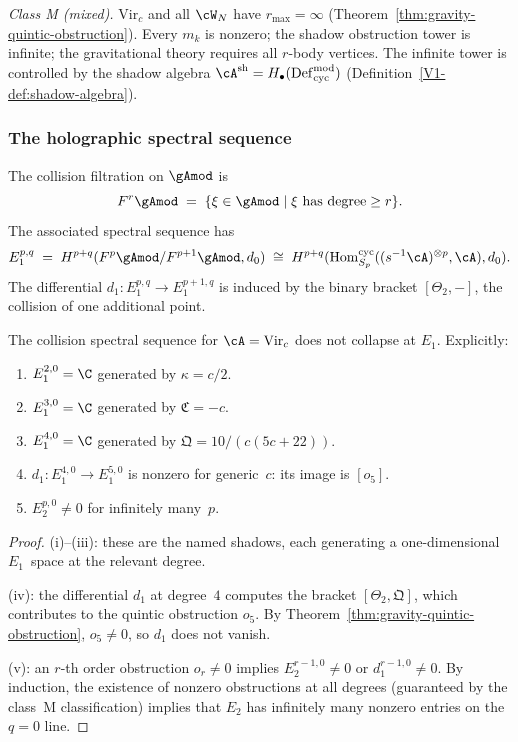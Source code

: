 \emph{Class M (mixed).}\enspace
$\mathrm{Vir}_c$ and all $\cW_N$ have $r_{\max} = \infty$
(Theorem~\ref{thm:gravity-quintic-obstruction}). Every $m_k$
is nonzero; the shadow obstruction tower is infinite; the gravitational
theory requires all $r$-body vertices. The infinite tower
is controlled by the shadow algebra $\cA^{\mathrm{sh}}
= H_\bullet(\mathrm{Def}_{\mathrm{cyc}}^{\mathrm{mod}})$
(Definition~\ref{V1-def:shadow-algebra}).

\subsubsection*{The holographic spectral sequence}

\begin{construction}
\label{constr:gravity-collision-ss}
The collision filtration on $\gAmod$ is
\[
F^r\gAmod
\;=\;
\{
 \xi \in \gAmod
 \mid
 \xi\text{ has degree} \ge r
\}.
\]
The associated spectral sequence has
\[
E_1^{p,q}
\;=\;
H^{p+q}(F^p\gAmod / F^{p+1}\gAmod, d_0)
\;\cong\;
H^{p+q}(\operatorname{Hom}_{S_p}^{\mathrm{cyc}}(
 (s^{-1}\cA)^{\otimes p}, \cA), d_0).
\]
The differential $d_1 \colon E_1^{p,q} \to E_1^{p+1,q}$ is
induced by the binary bracket $[\Theta_2, -]$, the collision of
one additional point.
\end{construction}

\begin{proposition}
\label{prop:gravity-ss-non-collapse}
The collision spectral sequence for $\cA = \mathrm{Vir}_c$ does
not collapse at $E_1$. Explicitly:
\begin{enumerate}[label=\textup{(\roman*)}]
\item $E_1^{2,0} = \C$ generated by $\kappa = c/2$.
\item $E_1^{3,0} = \C$ generated by $\mathfrak{C} = -c$.
\item $E_1^{4,0} = \C$ generated by
 $\mathfrak{Q} = 10/(c(5c+22))$.
\item $d_1 \colon E_1^{4,0} \to E_1^{5,0}$ is nonzero
 for generic~$c$: its image is $[o_5]$.
\item $E_2^{p,0} \ne 0$ for infinitely many~$p$.
\end{enumerate}
\end{proposition}

\begin{proof}
(i)--(iii): these are the named shadows, each generating a
one-dimensional $E_1$~space at the relevant degree.

(iv): the differential $d_1$ at degree~$4$ computes the bracket
$[\Theta_2, \mathfrak{Q}]$, which contributes to the quintic
obstruction $o_5$. By
Theorem~\ref{thm:gravity-quintic-obstruction},
$o_5 \ne 0$, so $d_1$ does not vanish.

(v): an $r$-th order obstruction $o_r \ne 0$ implies
$E_2^{r-1,0} \ne 0$ or $d_1^{r-1,0} \ne 0$. By induction,
the existence of nonzero obstructions at all degrees (guaranteed by
the class~M classification) implies that $E_2$ has infinitely
many nonzero entries on the $q = 0$ line.
\end{proof}

